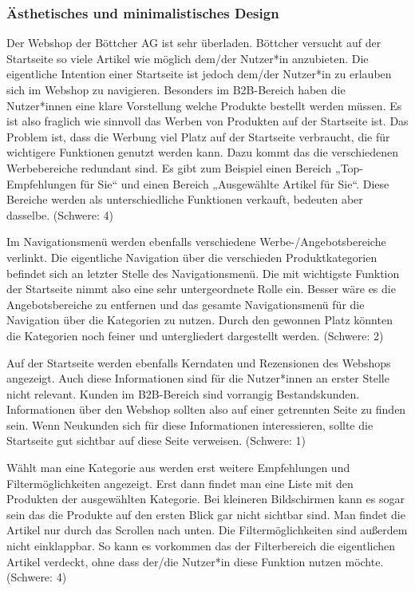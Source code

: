 \documentclass[utf8,biblatex]{lni}
\begin{document}
\subsubsection*{Ästhetisches und minimalistisches Design}
Der Webshop der Böttcher AG ist sehr überladen. Böttcher versucht auf der Startseite so viele Artikel wie möglich dem/der Nutzer*in anzubieten. Die eigentliche Intention einer Startseite ist jedoch dem/der Nutzer*in zu erlauben sich im Webshop zu navigieren. Besonders im B2B-Bereich haben die Nutzer*innen eine klare Vorstellung welche Produkte bestellt werden müssen. Es ist also fraglich wie sinnvoll das Werben von Produkten auf der Startseite ist. Das Problem ist, dass die Werbung viel Platz auf der Startseite verbraucht, die für wichtigere Funktionen genutzt werden kann. Dazu kommt das die verschiedenen Werbebereiche redundant sind. Es gibt zum Beispiel einen Bereich „Top-Empfehlungen für Sie“ und einen Bereich „Ausgewählte Artikel für Sie“. Diese Bereiche werden als unterschiedliche Funktionen verkauft, bedeuten aber dasselbe. (Schwere: 4)

Im Navigationsmenü werden ebenfalls verschiedene Werbe-/Angebotsbereiche verlinkt. Die eigentliche Navigation über die verschieden Produktkategorien befindet sich an letzter Stelle des Navigationsmenü. Die mit wichtigste Funktion der Startseite nimmt also eine sehr untergeordnete Rolle ein. Besser wäre es die Angebotsbereiche zu entfernen und das gesamte Navigationsmenü für die Navigation über die Kategorien zu nutzen. Durch den gewonnen Platz könnten die Kategorien noch feiner und untergliedert dargestellt werden. (Schwere: 2)

Auf der Startseite werden ebenfalls Kerndaten und Rezensionen des Webshops angezeigt. Auch diese Informationen sind für die Nutzer*innen an erster Stelle nicht relevant. Kunden im B2B-Bereich sind vorrangig Bestandskunden. Informationen über den Webshop sollten also auf einer getrennten Seite zu finden sein. Wenn Neukunden sich für diese Informationen interessieren, sollte die Startseite gut sichtbar auf diese Seite verweisen. (Schwere: 1)

Wählt man eine Kategorie aus werden erst weitere Empfehlungen und Filtermöglichkeiten angezeigt. Erst dann findet man eine Liste mit den Produkten der ausgewählten Kategorie. Bei kleineren Bildschirmen kann es sogar sein das die Produkte auf den ersten Blick gar nicht sichtbar sind. Man findet die Artikel nur durch das Scrollen nach unten. Die Filtermöglichkeiten sind außerdem nicht einklappbar. So kann es vorkommen das der Filterbereich die eigentlichen Artikel verdeckt, ohne dass der/die Nutzer*in diese Funktion nutzen möchte. (Schwere: 4)
\end{document}
